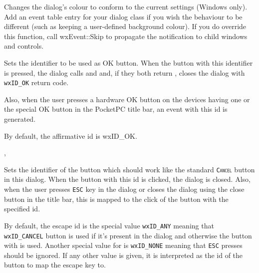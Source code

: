 

Changes the dialog's colour to conform to the current settings (Windows only).
Add an event table entry for your dialog class if you wish the behaviour
to be different (such as keeping a user-defined
background colour). If you do override this function, call wxEvent::Skip to
propagate the notification to child windows and controls.




\label{wxdialogsetaffirmativeid}


Sets the identifier to be used as OK button. When the button with this
identifier is pressed, the dialog calls  
and  
and, if they both return \true, closes the dialog with \texttt{wxID\_OK} return
code.

Also, when the user presses a hardware OK button on the devices having one or
the special OK button in the PocketPC title bar, an event with this id is
generated.

By default, the affirmative id is wxID\_OK.


, 


\label{wxdialogsetescapeid}


Sets the identifier of the button which should work like the standard 
\texttt{\textsc{Cancel}} button in this dialog. When the button with this id is
clicked, the dialog is closed. Also, when the user presses \texttt{\textsc{ESC}} 
key in the dialog or closes the dialog using the close button in the title bar,
this is mapped to the click of the button with the specified id.

By default, the escape id is the special value \texttt{wxID\_ANY} meaning that 
\texttt{wxID\_CANCEL} button is used if it's present in the dialog and
otherwise the button with  
is used. Another special value for  is \texttt{wxID\_NONE} meaning that
\texttt{\textsc{ESC}} presses should be ignored. If any other value is given, it
is interpreted as the id of the button to map the escape key to.


